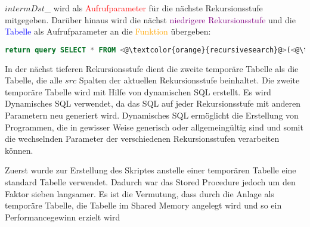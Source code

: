 $intermDst$\_ wird als \textcolor{red}{Aufrufparameter} für die nächste Rekursionsstufe mitgegeben. Darüber hinaus wird die nächst \textcolor{purple}{niedrigere Rekursionsstufe} und die
\textcolor{blue}{Tabelle} als Aufrufparameter an die \textcolor{orange}{Funktion} übergeben:
\begin{lstlisting}[language=SQL,caption = Aufrufen der nächst tieferen Rekursionsstufe,frame=single, label={2.AbbruchbedingungRecursiveSearch.listing} ]
    return query SELECT * FROM <@\textcolor{orange}{recursivesearch}@>(<@\textcolor{red}{intermDst\_}@>, <@\textcolor{purple}{iRecursionDepth - 1}@>, <@\textcolor{blue}{sTable}@>);
\end{lstlisting}
In der nächst tieferen Rekursionsstufe dient die zweite temporäre Tabelle als die Tabelle, die alle $src$ Spalten der aktuellen Rekursionsstufe beinhaltet.
Die zweite temporäre Tabelle wird mit Hilfe von dynamischen \ac{SQL} erstellt.
Es wird Dynamisches SQL verwendet, da das \ac{SQL} auf jeder Rekursionsstufe mit anderen Parametern neu generiert wird.
Dynamisches SQL ermöglicht die Erstellung von Programmen, die in gewisser Weise generisch oder allgemeingültig sind und somit die wechselnden Parameter der verschiedenen Rekursionsstufen verarbeiten können.\cite[S.316 - 317]{froehlich01}

Zuerst wurde zur Erstellung des Skriptes anstelle einer temporären Tabelle eine standard Tabelle verwendet.
Dadurch war das Stored Procedure jedoch um den Faktor sieben langsamer.
Es ist die Vermutung, dass durch die Anlage als temporäre Tabelle, die Tabelle im Shared Memory angelegt wird und so ein Performancegewinn erzielt wird \cite[S.26]{froehlich01}
